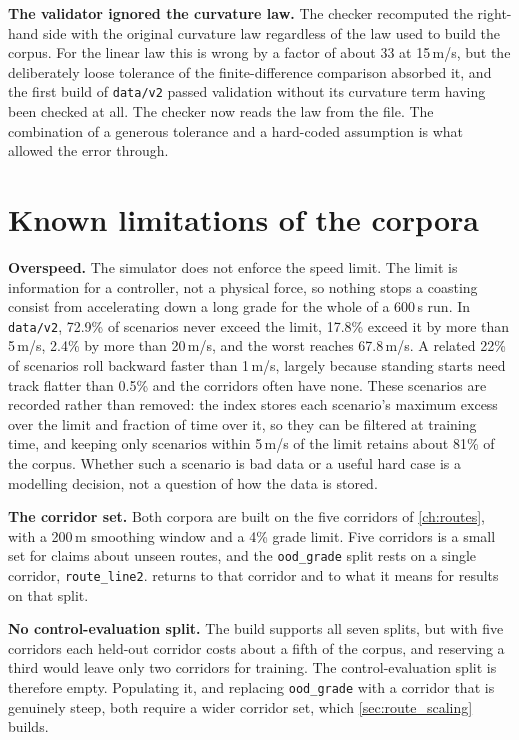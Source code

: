 \textbf{The validator ignored the curvature law.} The checker recomputed the right-hand side with the original curvature law regardless of the law used to build the corpus. For the linear law this is wrong by a factor of about 33 at 15\,m/s, but the deliberately loose tolerance of the finite-difference comparison absorbed it, and the first build of \texttt{data/v2} passed validation without its curvature term having been checked at all. The checker now reads the law from the file. The combination of a generous tolerance and a hard-coded assumption is what allowed the error through.

\section{Known limitations of the corpora}
\label{sec:dataset_limitations}

\textbf{Overspeed.} The simulator does not enforce the speed limit. The limit is information for a controller, not a physical force, so nothing stops a coasting consist from accelerating down a long grade for the whole of a 600\,s run. In \texttt{data/v2}, 72.9\% of scenarios never exceed the limit, 17.8\% exceed it by more than 5\,m/s, 2.4\% by more than 20\,m/s, and the worst reaches 67.8\,m/s. A related 22\% of scenarios roll backward faster than 1\,m/s, largely because standing starts need track flatter than 0.5\% and the corridors often have none. These scenarios are recorded rather than removed: the index stores each scenario's maximum excess over the limit and fraction of time over it, so they can be filtered at training time, and keeping only scenarios within 5\,m/s of the limit retains about 81\% of the corpus. Whether such a scenario is bad data or a useful hard case is a modelling decision, not a question of how the data is stored.

\textbf{The corridor set.} Both corpora are built on the five corridors of \cref{ch:routes}, with a 200\,m smoothing window and a 4\% grade limit. Five corridors is a small set for claims about unseen routes, and the \texttt{ood\_grade} split rests on a single corridor, \texttt{route\_line2}.  returns to that corridor and to what it means for results on that split.

\textbf{No control-evaluation split.} The build supports all seven splits, but with five corridors each held-out corridor costs about a fifth of the corpus, and reserving a third would leave only two corridors for training. The control-evaluation split is therefore empty. Populating it, and replacing \texttt{ood\_grade} with a corridor that is genuinely steep, both require a wider corridor set, which \cref{sec:route_scaling} builds.

